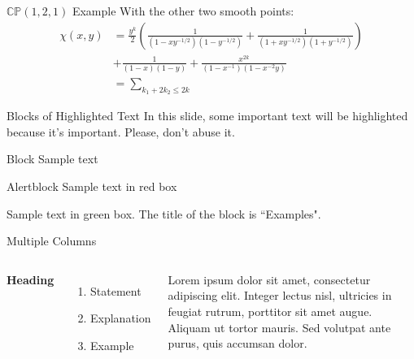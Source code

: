 \documentclass[aspectratio=169,xcolor=dvipsnames]{beamer}
\newcommand{\CC}{\mathbb{C}}
\newcommand{\PP}{\mathbb{P}}
\begin{document}
\begin{frame}{$\CC\PP(1,2,1)$ Example}
    With the other two smooth points:
    \begin{align*}
        \chi(x,y) &= \frac{y^{k}}{2}\left( \frac{1}{(1 - xy^{-1/2})(1 - y^{-1/2})} + \frac{1}{(1 + xy^{-1/2})(1 + y^{-1/2})} \right) \\
        &+ \frac{1}{(1-x)(1-y)} + \frac{x^{2k}}{(1-x^{-1})(1 - x^{-2}y) } \\
        &= \sum_{k_{1} + 2k_{2} \leq 2k}
    \end{align*}
\end{frame}


\begin{frame}{Blocks of Highlighted Text}
    In this slide, some important text will be \alert{highlighted} because it's important. Please, don't abuse it.

    \begin{block}{Block}
        Sample text
    \end{block}

    \begin{alertblock}{Alertblock}
        Sample text in red box
    \end{alertblock}

    \begin{examples}
        Sample text in green box. The title of the block is ``Examples".
    \end{examples}
\end{frame}


\begin{frame}{Multiple Columns}
    \begin{columns}[c] %

        \textbf{Heading}
        \begin{enumerate}
            \item Statement
            \item Explanation
            \item Example
        \end{enumerate}

        Lorem ipsum dolor sit amet, consectetur adipiscing elit. Integer lectus nisl, ultricies in feugiat rutrum, porttitor sit amet augue. Aliquam ut tortor mauris. Sed volutpat ante purus, quis accumsan dolor.

    \end{columns}
\end{frame}
\end{document}
